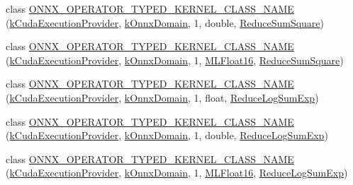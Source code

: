 \begin{DoxyCompactItemize}
\item 
class \mbox{\hyperlink{namespaceonnxruntime_1_1cuda_acc8e6df44bf89806f1a2c7f53510a0c1}{O\+N\+N\+X\+\_\+\+O\+P\+E\+R\+A\+T\+O\+R\+\_\+\+T\+Y\+P\+E\+D\+\_\+\+K\+E\+R\+N\+E\+L\+\_\+\+C\+L\+A\+S\+S\+\_\+\+N\+A\+ME}} (\mbox{\hyperlink{namespaceonnxruntime_a73ebc64887ddd1968e3cef47ffefe35b}{k\+Cuda\+Execution\+Provider}}, \mbox{\hyperlink{namespaceonnxruntime_ac0e7c0c106a2c9e9594560a3ab289fa0}{k\+Onnx\+Domain}}, 1, double, \mbox{\hyperlink{classonnxruntime_1_1cuda_1_1ReduceSumSquare}{Reduce\+Sum\+Square}})
\item 
class \mbox{\hyperlink{namespaceonnxruntime_1_1cuda_a2a0758f0251053cd7f9a1058dcc6284c}{O\+N\+N\+X\+\_\+\+O\+P\+E\+R\+A\+T\+O\+R\+\_\+\+T\+Y\+P\+E\+D\+\_\+\+K\+E\+R\+N\+E\+L\+\_\+\+C\+L\+A\+S\+S\+\_\+\+N\+A\+ME}} (\mbox{\hyperlink{namespaceonnxruntime_a73ebc64887ddd1968e3cef47ffefe35b}{k\+Cuda\+Execution\+Provider}}, \mbox{\hyperlink{namespaceonnxruntime_ac0e7c0c106a2c9e9594560a3ab289fa0}{k\+Onnx\+Domain}}, 1, \mbox{\hyperlink{uniononnxruntime_1_1MLFloat16}{M\+L\+Float16}}, \mbox{\hyperlink{classonnxruntime_1_1cuda_1_1ReduceSumSquare}{Reduce\+Sum\+Square}})
\item 
class \mbox{\hyperlink{namespaceonnxruntime_1_1cuda_ab9de59f9438c555f9a9e4101a4928824}{O\+N\+N\+X\+\_\+\+O\+P\+E\+R\+A\+T\+O\+R\+\_\+\+T\+Y\+P\+E\+D\+\_\+\+K\+E\+R\+N\+E\+L\+\_\+\+C\+L\+A\+S\+S\+\_\+\+N\+A\+ME}} (\mbox{\hyperlink{namespaceonnxruntime_a73ebc64887ddd1968e3cef47ffefe35b}{k\+Cuda\+Execution\+Provider}}, \mbox{\hyperlink{namespaceonnxruntime_ac0e7c0c106a2c9e9594560a3ab289fa0}{k\+Onnx\+Domain}}, 1, float, \mbox{\hyperlink{classonnxruntime_1_1cuda_1_1ReduceLogSumExp}{Reduce\+Log\+Sum\+Exp}})
\item 
class \mbox{\hyperlink{namespaceonnxruntime_1_1cuda_a3fb6ea245a3cd51337322eeab4878085}{O\+N\+N\+X\+\_\+\+O\+P\+E\+R\+A\+T\+O\+R\+\_\+\+T\+Y\+P\+E\+D\+\_\+\+K\+E\+R\+N\+E\+L\+\_\+\+C\+L\+A\+S\+S\+\_\+\+N\+A\+ME}} (\mbox{\hyperlink{namespaceonnxruntime_a73ebc64887ddd1968e3cef47ffefe35b}{k\+Cuda\+Execution\+Provider}}, \mbox{\hyperlink{namespaceonnxruntime_ac0e7c0c106a2c9e9594560a3ab289fa0}{k\+Onnx\+Domain}}, 1, double, \mbox{\hyperlink{classonnxruntime_1_1cuda_1_1ReduceLogSumExp}{Reduce\+Log\+Sum\+Exp}})
\item 
class \mbox{\hyperlink{namespaceonnxruntime_1_1cuda_a98de8541c191626f53e50b2e01e74cbd}{O\+N\+N\+X\+\_\+\+O\+P\+E\+R\+A\+T\+O\+R\+\_\+\+T\+Y\+P\+E\+D\+\_\+\+K\+E\+R\+N\+E\+L\+\_\+\+C\+L\+A\+S\+S\+\_\+\+N\+A\+ME}} (\mbox{\hyperlink{namespaceonnxruntime_a73ebc64887ddd1968e3cef47ffefe35b}{k\+Cuda\+Execution\+Provider}}, \mbox{\hyperlink{namespaceonnxruntime_ac0e7c0c106a2c9e9594560a3ab289fa0}{k\+Onnx\+Domain}}, 1, \mbox{\hyperlink{uniononnxruntime_1_1MLFloat16}{M\+L\+Float16}}, \mbox{\hyperlink{classonnxruntime_1_1cuda_1_1ReduceLogSumExp}{Reduce\+Log\+Sum\+Exp}})

\end{DoxyCompactItemize}
